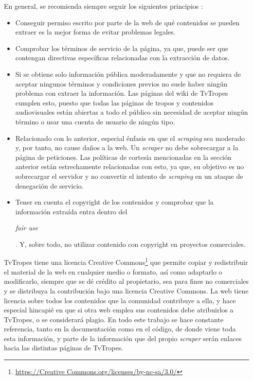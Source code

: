 En general, se recomienda siempre seguir los siguientes principios
\cite{apress2018scraping}:
\begin{itemize}
    \item Conseguir permiso escrito por parte de la web de qué contenidos se
    pueden extraer es la mejor forma de evitar problemas legales.
    \item Comprobar los términos de servicio de la página, ya que, puede ser que
    contengan directivas específicas relacionadas con la extracción de datos.
    \item Si se obtiene solo información pública moderadamente y que no requiera
    de aceptar ningunos términos y condiciones previos no suele haber ningún
    problema con extraer la información. Las páginas del wiki de TvTropes
    cumplen esto, puesto que todas las páginas de tropos y contenidos
    audiovisuales están abiertas a todo el público sin necesidad de aceptar
    ningún término o usar una cuenta de usuario de ningún tipo.
    \item Relacionado con lo anterior, especial énfasis en que el
    \textit{scraping} sea moderado y, por tanto, no cause daños a la web. Un
    \textit{scraper} no debe sobrecargar a la página de peticiones. Las
    políticas de cortesía mencionadas en la sección anterior están estrechamente
    relacionadas con esto, ya que, su objetivo es no sobrecargar el servidor y
    no convertir el intento de \textit{scraping} en un ataque de denegación de
    servicio.
    \item Tener en cuenta el copyright de los contenidos y comprobar que la
    información extraída entra dentro del
    \begin{otherlanguage}{english}\textit{fair use}\end{otherlanguage}. Y, sobre
    todo, no utilizar contenido con copyright en proyectos comerciales.
\end{itemize}

TvTropes tiene una licencia Creative Commons\footnote{\url{https://Creative
Commons.org/licenses/by-nc-sa/3.0/}} que permite copiar y redistribuir el
material de la web en cualquier medio o formato, así como adaptarlo o
modificarlo, siempre que se dé crédito al propietario, sea para fines no
comerciales y se distribuya la contribución bajo una licencia Creative Commons.
La web tiene licencia sobre todos los contenidos que la comunidad contribuye a
ella, y hace especial hincapié en que si otra web emplea sus contenidos debe
atribuirlos a TvTropes, o se considerará plagio. En todo este trabajo se hace
constante referencia, tanto en la documentación como en el código, de donde
viene toda esta información, y parte de la información que del propio
\textit{scraper} serán enlaces hacia las distintas páginas de TvTropes. 

